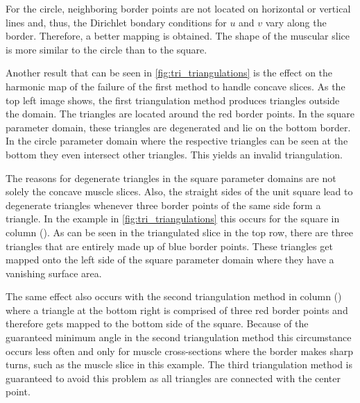 For the circle, neighboring border points are not located on horizontal or vertical lines and, thus, the Dirichlet bondary conditions for $u$ and $v$ vary along the border. Therefore, a better mapping is obtained. The shape of the muscular slice is more similar to the circle than to the square.

Another result that can be seen in \cref{fig:tri_triangulations} is the effect on the harmonic map of the failure of the first method to handle concave slices. As the top left image shows, the first triangulation method produces triangles outside the domain. The triangles are located around the red border points. In the square parameter domain, these triangles are degenerated and lie on the bottom border. In the circle parameter domain where the respective triangles can be seen at the bottom they even intersect other triangles. This yields an invalid triangulation.

The reasons for degenerate triangles in the square parameter domains are not solely the concave muscle slices. Also, the straight sides of the unit square lead to degenerate triangles whenever three border points of the same side form a triangle.
In the example in \cref{fig:tri_triangulations} this occurs for the square in column (). As can be seen in the triangulated slice in the top row, there are three triangles that are entirely made up of blue border points. These triangles get mapped onto the left side of the square parameter domain where they have a vanishing surface area.

The same effect also occurs with the second triangulation method in column () where a triangle at the bottom right is comprised of three red border points and therefore gets mapped to the bottom side of the square. Because of the guaranteed minimum angle in the second triangulation method this circumstance occurs less often and only for muscle cross-sections where the border makes sharp turns, such as the muscle slice in this example. The third triangulation method is guaranteed to avoid this problem as all triangles are connected with the center point.

